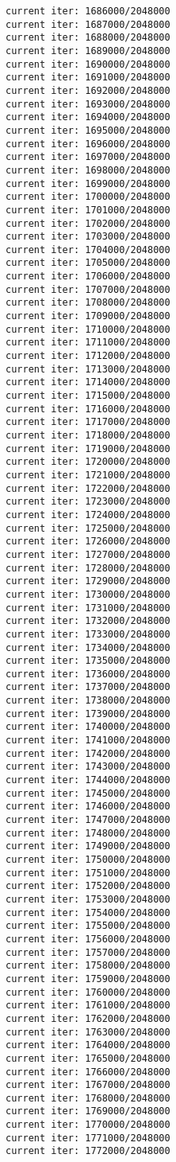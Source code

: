 \documentclass[11pt]{article}
\begin{document}
\begin{Verbatim}[commandchars=\\\{\}]
current iter: 1686000/2048000
current iter: 1687000/2048000
current iter: 1688000/2048000
current iter: 1689000/2048000
current iter: 1690000/2048000
current iter: 1691000/2048000
current iter: 1692000/2048000
current iter: 1693000/2048000
current iter: 1694000/2048000
current iter: 1695000/2048000
current iter: 1696000/2048000
current iter: 1697000/2048000
current iter: 1698000/2048000
current iter: 1699000/2048000
current iter: 1700000/2048000
current iter: 1701000/2048000
current iter: 1702000/2048000
current iter: 1703000/2048000
current iter: 1704000/2048000
current iter: 1705000/2048000
current iter: 1706000/2048000
current iter: 1707000/2048000
current iter: 1708000/2048000
current iter: 1709000/2048000
current iter: 1710000/2048000
current iter: 1711000/2048000
current iter: 1712000/2048000
current iter: 1713000/2048000
current iter: 1714000/2048000
current iter: 1715000/2048000
current iter: 1716000/2048000
current iter: 1717000/2048000
current iter: 1718000/2048000
current iter: 1719000/2048000
current iter: 1720000/2048000
current iter: 1721000/2048000
current iter: 1722000/2048000
current iter: 1723000/2048000
current iter: 1724000/2048000
current iter: 1725000/2048000
current iter: 1726000/2048000
current iter: 1727000/2048000
current iter: 1728000/2048000
current iter: 1729000/2048000
current iter: 1730000/2048000
current iter: 1731000/2048000
current iter: 1732000/2048000
current iter: 1733000/2048000
current iter: 1734000/2048000
current iter: 1735000/2048000
current iter: 1736000/2048000
current iter: 1737000/2048000
current iter: 1738000/2048000
current iter: 1739000/2048000
current iter: 1740000/2048000
current iter: 1741000/2048000
current iter: 1742000/2048000
current iter: 1743000/2048000
current iter: 1744000/2048000
current iter: 1745000/2048000
current iter: 1746000/2048000
current iter: 1747000/2048000
current iter: 1748000/2048000
current iter: 1749000/2048000
current iter: 1750000/2048000
current iter: 1751000/2048000
current iter: 1752000/2048000
current iter: 1753000/2048000
current iter: 1754000/2048000
current iter: 1755000/2048000
current iter: 1756000/2048000
current iter: 1757000/2048000
current iter: 1758000/2048000
current iter: 1759000/2048000
current iter: 1760000/2048000
current iter: 1761000/2048000
current iter: 1762000/2048000
current iter: 1763000/2048000
current iter: 1764000/2048000
current iter: 1765000/2048000
current iter: 1766000/2048000
current iter: 1767000/2048000
current iter: 1768000/2048000
current iter: 1769000/2048000
current iter: 1770000/2048000
current iter: 1771000/2048000
current iter: 1772000/2048000

\end{Verbatim}
\end{document}
